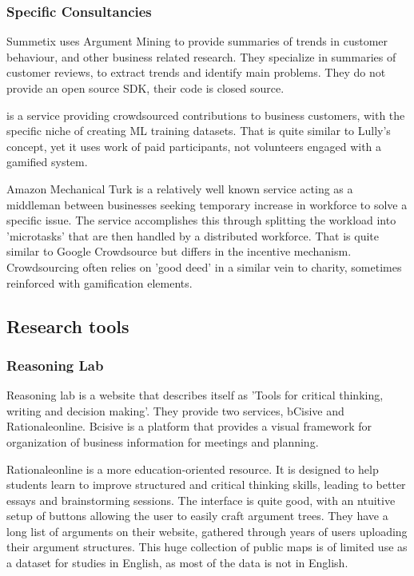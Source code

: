 \documentclass{report}
\begin{document}
\subsubsection{Specific Consultancies}
Summetix \cite{schiller_stance_2021} uses Argument Mining to provide summaries of trends in customer behaviour, and other business related research. They specialize in summaries of customer reviews, to extract trends and identify main problems. They do not provide an open source SDK, their code is closed source.

\cite{noauthor_crowdee_nodate} is a service providing crowdsourced contributions to business customers, with the specific niche of creating ML training datasets. That is quite similar to Lully's concept, yet it uses work of paid participants, not volunteers engaged with a gamified system.

Amazon Mechanical Turk \cite{noauthor_amazon_nodate} is a relatively well known service acting as a middleman between businesses seeking temporary increase in workforce to solve a specific issue.
The service accomplishes this through splitting the workload into 'microtasks' that are then handled by a distributed workforce. That is quite similar to Google Crowdsource but differs in the incentive mechanism. Crowdsourcing often relies on 'good deed' in a similar vein to charity, sometimes reinforced with gamification elements.

\subsection{Research tools}
\subsubsection{Reasoning Lab}
Reasoning lab \cite{noauthor_argument_nodate} is a website that describes itself as 'Tools for critical thinking, writing and decision making'. They provide two services, bCisive and Rationaleonline.
Bcisive \cite{noauthor_bcisive_nodate} is a platform that provides a visual framework for organization of business information for meetings and planning.

Rationaleonline \cite{noauthor_rationale_nodate} is a more education-oriented resource. It is designed to help students learn to improve structured and critical thinking skills, leading to better essays and brainstorming sessions.
The interface is quite good, with an ntuitive setup of buttons allowing the user to easily craft argument trees.
They have a long list of arguments on their website, gathered through years of users uploading their argument structures.
This huge collection of public maps is of limited use as a dataset for studies in English, as most of the data is not in English.
\end{document}
